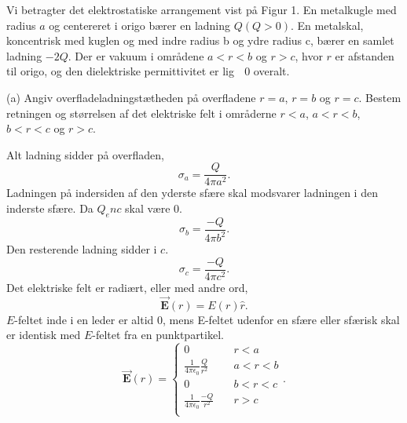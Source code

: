 
\title{\vspace{-1cm}\vspace{-1cm}}
\author{}
\date{}


\pagecolor{color1}
\maketitle
\thispagestyle{fancy}
\begin{exercise}[Opgave 1]
Vi betragter det elektrostatiske arrangement vist på Figur 1. En metalkugle
med radius $a$ og centereret i origo bærer en ladning $Q (Q > 0)$. En metalskal,
koncentrisk med kuglen og med indre radius b og ydre radius c, bærer en
samlet ladning $−2Q$. Der er vakuum i områdene $a < r < b$ og $r > c$, hvor $r$
er afstanden til origo, og den dielektriske permittivitet er lig  0 overalt.
\end{exercise}
\begin{figure}[ht]
    \centering
    \label{fig:opgave1}
\end{figure}
\begin{subexercise}[a]
(a) Angiv overfladeladningstætheden på overfladene $r = a$, $r = b$ og $r = c$.
Bestem retningen og størrelsen af det elektriske felt i områderne $r < a$,
$a < r < b$, $b < r < c$ og $r > c$.
\end{subexercise}
\begin{solution}
	Alt ladning sidder på overfladen,
	\[
	\sigma_a = \frac{Q}{4\pi a^2}
	.\] 
	Ladningen på indersiden af den yderste sfære skal modsvarer ladningen i den inderste sfære. Da $Q_enc$ skal være 0.
	 \[
	\sigma_b = \frac{-Q}{4\pi b^2}
	.\] 
	Den resterende ladning sidder i $c$.
	 \[
	\sigma_c = \frac{-Q}{4\pi c^2}
	.\]
	Det elektriske felt er radiært, eller med andre ord,
	\[
	\vec{\mathbf{E}}\left( r \right) = E\left( r \right) \hat{r} 
	.\] 
	$E$-feltet inde i en leder er altid $0$, mens E-feltet udenfor en sfære eller sfærisk skal er identisk med $E$-feltet fra en punktpartikel.
	\[
	\vec{\mathbf{E}} \left( r \right) = 
	\begin{cases}
		0 \quad & r<a \\
		\frac{1}{4\pi \epsilon_0}\frac{Q}{r^2} \quad & a<r<b \\
		0 \quad & b<r<c \\
		\frac{1}{4\pi \epsilon_0}\frac{-Q}{r^2} \quad & r>c \\
	\end{cases}
	.\] 
\end{solution}
